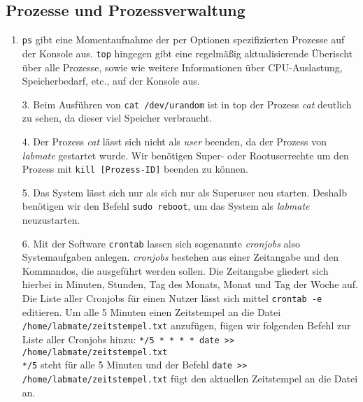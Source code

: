\documentclass{scrartcl}
\begin{document}
    \subsection{Prozesse und Prozessverwaltung}
    \label{sub:Prozesse und Prozessverwaltung}

    \begin{enumerate} [1.]
      \item \texttt{ps} gibt eine Momentaufnahme der per Optionen spezifizierten Prozesse
            auf der Konsole aus. \texttt{top} hingegen gibt eine regelmäßig
            aktualisierende Überischt über alle Prozesse, sowie wie weitere
            Informationen über CPU-Auslastung, Speicherbedarf, etc., auf der Konsole
            aus.
      \item [3.] Beim Ausführen von \texttt{cat /dev/urandom} ist in top der Prozess
            \textit{cat} deutlich zu sehen, da dieser viel Speicher verbraucht.
      \item [4.] Der Prozess \textit{cat} lässt sich nicht als \textit{user} beenden,
            da der Prozess von \textit{labmate} gestartet wurde. Wir benötigen
            Super- oder Rootuserrechte um den Prozess mit \texttt{kill [Prozess-ID]}
            beenden zu können.
      \item [5.] Das System lässt sich nur als sich nur als Superuser neu starten.
            Deshalb benötigen wir den Befehl \texttt{sudo reboot}, um das System als
            \textit{labmate} neuzustarten.
      \item [6.] Mit der Software \texttt{crontab} lassen sich sogenannte \textit{cronjobs}
            also Systemaufgaben anlegen. \textit{cronjobs} bestehen aus einer
            Zeitangabe und den Kommandos, die ausgeführt werden sollen.
            Die Zeitangabe gliedert sich hierbei in Minuten, Stunden, Tag des Monats,
            Monat und Tag der Woche auf. Die Liste aller Cronjobs für einen Nutzer
            lässt sich mittel \texttt{crontab -e} editieren. Um alle 5 Minuten
            einen Zeitstempel an die Datei \texttt{/home/labmate/zeitstempel.txt}
            anzufügen, fügen wir folgenden Befehl zur Liste aller Cronjobs hinzu:
            \verb+*/5 * * * * date >> /home/labmate/zeitstempel.txt+\\
            \texttt{*/5} steht für alle 5 Minuten und der Befehl
            \verb+date >> /home/labmate/zeitstempel.txt+ fügt den aktuellen
            Zeitstempel an die Datei an.
    \end{enumerate}
\end{document}
